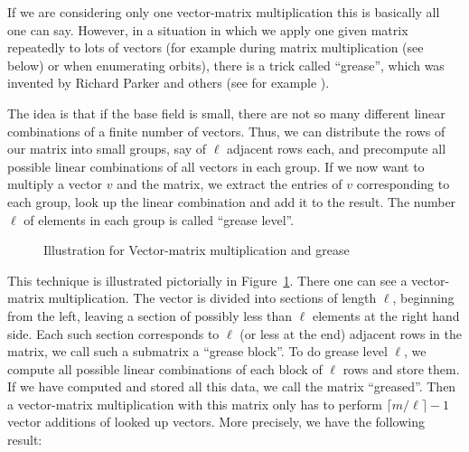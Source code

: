 If we are considering only one vector-matrix multiplication this is basically
all one can say. However, in a situation in which we apply one given
matrix repeatedly to lots of vectors (for example during matrix 
multiplication (see below) or when enumerating orbits), there is a
trick called ``grease'', which was invented by Richard Parker and 
others (see for example \cite[Algorithm 6.2]{ahohop}).

The idea is that if the base field is small, there are not so many
different linear combinations of a finite number of vectors. Thus,
we can distribute the rows of our matrix into small groups, say of
$\ell$ adjacent rows each, and precompute all possible linear combinations of
all vectors in each group. If we now want to multiply a vector $v$ and the 
matrix, we extract the entries of $v$ corresponding to each group,
look up the linear combination and add it to the result. The number
$\ell$ of elements in each group is called ``grease level''.

\begin{figure}[ht]
\begin{center}

\end{center}
\caption{Illustration for Vector-matrix multiplication and grease}
\label{grease}
\end{figure}

This technique is illustrated pictorially in Figure~\ref{grease}. There
one can see a vector-matrix multiplication. The vector is divided into
sections of length $\ell$, beginning from the left, leaving a section of
possibly less than $\ell$ elements at the right hand side. Each such section
corresponds to $\ell$ (or less at the end) adjacent rows in the matrix, we 
call such a submatrix a ``grease block''.
To do grease level $\ell$, we compute all possible linear combinations of
each block of $\ell$ rows and store them. If we have computed and stored
all this data, we call the matrix ``greased''.
Then a vector-matrix multiplication
with this matrix only has to perform $\lceil m/\ell \rceil -1$ vector additions
of looked up vectors. More precisely, we have the following result:

